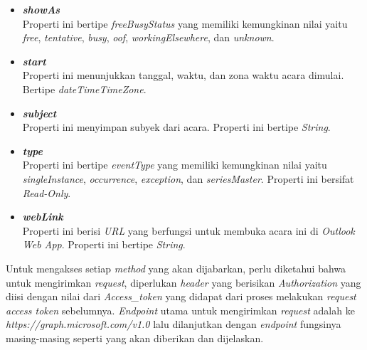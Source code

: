 \begin{itemize}
	\item \textbf{\textit{showAs}}\\
	Properti ini bertipe \textit{freeBusyStatus} yang memiliki kemungkinan nilai yaitu \textit{free}, \textit{tentative}, \textit{busy}, \textit{oof}, \textit{workingElsewhere}, dan \textit{unknown}. 
	\item \textbf{\textit{start}}\\
	Properti ini menunjukkan tanggal, waktu, dan zona waktu acara dimulai. Bertipe \textit{dateTimeTimeZone}. 
	\item \textbf{\textit{subject}}\\
	Properti ini menyimpan subyek dari acara. Properti ini bertipe \textit{String}.
	\item \textbf{\textit{type}}\\
	Properti ini bertipe \textit{eventType} yang memiliki kemungkinan nilai yaitu \textit{singleInstance}, \textit{occurrence}, \textit{exception}, dan \textit{seriesMaster}. Properti ini bersifat \textit{Read-Only}. 
	\item \textbf{\textit{webLink}}\\
	Properti ini berisi \textit{URL} yang berfungsi untuk membuka acara ini di \textit{Outlook Web App}. Properti ini bertipe \textit{String}. 
\end{itemize}

Untuk mengakses setiap \textit{method} yang akan dijabarkan, perlu diketahui bahwa untuk mengirimkan \textit{request}, diperlukan \textit{header} yang berisikan \textit{Authorization} yang diisi dengan nilai dari \textit{Access\_token} yang didapat dari proses melakukan \textit{request access token} sebelumnya. \textit{Endpoint} utama untuk mengirimkan \textit{request} adalah ke \textit{https://graph.microsoft.com/v1.0} lalu dilanjutkan dengan \textit{endpoint} fungsinya masing-masing seperti yang akan diberikan dan dijelaskan. 

